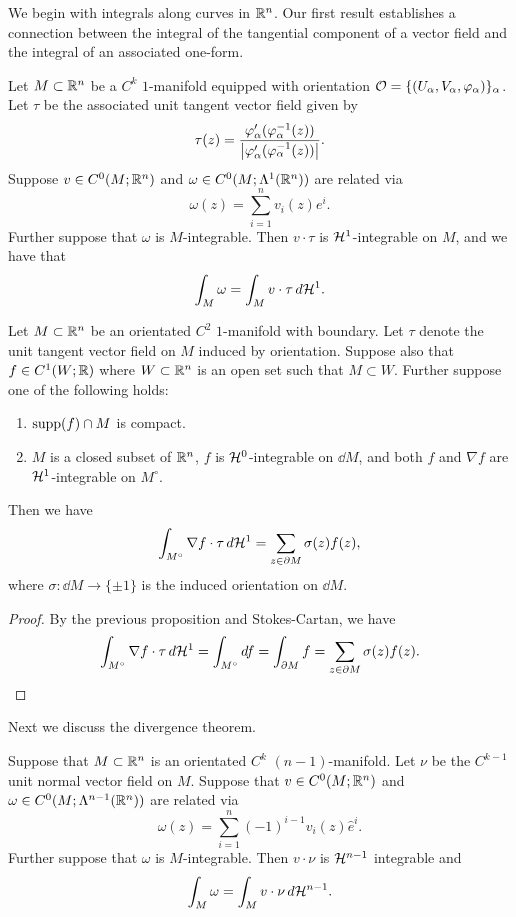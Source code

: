 \documentclass[a4paper]{article}
\begin{document}
We begin with integrals along curves in $\mathbb{R}^n$. Our first result
establishes a connection between the integral of the tangential component
of a vector field and the integral of an associated one-form.

\begin{prop}
  Let $M \subset \mathbb{R}^n$ be a $C^k$ $1$-manifold equipped with orientation
  $\mathcal{O} = \{(U_\alpha, V_\alpha, \varphi_\alpha)\}_\alpha$. Let $\tau$ be
  the associated unit tangent vector field given by
  \[
    \tau(z) = \frac{\varphi_\alpha'(\varphi_\alpha^{-1}(z))}
    {\left\lvert \varphi_\alpha'(\varphi_\alpha^{-1}(z))\right\rvert}.
  \]
  Suppose $v \in C^0(M; \mathbb{R}^n)$ and $\omega \in C^0 (M; \Lambda^1 (\mathbb{R}^n))$
  are related via
  \[
    \omega(z) = \sum_{i=1}^n v_i(z) e^i.
  \]
  Further suppose that $\omega$ is $M$-integrable. Then $v \cdot \tau$ is
  $\mathcal{H}^1$-integrable on $M$, and we have that
  \[
    \int_M \omega = \int_M v \cdot \tau \, d \mathcal{H}^1.
  \]
\end{prop}

\begin{thm}
  Let $M \subset \mathbb{R}^n$ be an orientated $C^2$ $1$-manifold
  with boundary. Let $\tau$ denote the unit tangent
  vector field on $M$ induced by orientation. Suppose also
  that $f \in C^1 (W; \mathbb{R})$ where $W \subset \mathbb{R}^n$ is an open set
  such that $M \subset W$. Further suppose one of the following
  holds:
  \begin{enumerate}
    \item $\operatorname{supp}(f) \cap M$ is compact.
    \item $M$ is a closed subset of $\mathbb{R}^n$, $f$ is $\mathcal{H}^0$-integrable
          on $\dd M$, and both $f$ and $\nabla f$ are $\mathcal{H}^1$-integrable
          on $M^\circ$.
  \end{enumerate}
  Then we have
  \[
    \int_{M^\circ} \nabla f \cdot \tau \, d \mathcal{H}^1
    = \sum_{z \in \partial M} \sigma(z) f(z),
  \]
  where $\sigma : \dd M \to \{\pm 1\}$ is the induced orientation on $\dd
  M$.
\end{thm}

\begin{proof}
  By the previous proposition and Stokes-Cartan, we have
  \[
    \int_{M^\circ} \nabla f \cdot \tau \, d \mathcal{H}^1
    = \int_{M^\circ} d f
    = \int_{\partial M} f
    = \sum_{z \in \partial M} \sigma(z) f(z).
  \]
\end{proof}

Next we discuss the divergence theorem.

\begin{prop}
  Suppose that $M \subset \mathbb{R}^n$ is an orientated $C^k$ $(n-1)$-manifold.
  Let $\nu$ be the $C^{k-1}$ unit normal vector field on $M$. Suppose that
  $v \in C^0(M ; \mathbb{R}^n)$ and $\omega \in C^0(M; \Lambda^{n-1}(\mathbb{R}^n))$ are
  related via
  \[
    \omega(z) = \sum_{i=1}^n (-1)^{i-1} v_i(z) \hat{e}^i.
  \]
  Further suppose that $\omega$ is $M$-integrable. Then $v \cdot \nu$ is
  $\mathcal{H}^{n-1}$ integrable and
  \[
    \int_M \omega = \int_M v \cdot \nu \, d \mathcal{H}^{n-1}.
  \]
\end{prop}
\end{document}
